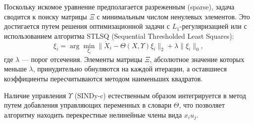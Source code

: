 Поскольку искомое уравнение предполагается разреженным (sparse), задача сводится к поиску матрицы $\Xi$ с минимальным числом ненулевых элементов. Это достигается путем решения оптимизационной задачи с $L_1$-регуляризацией или с использованием алгоритма STLSQ (Sequential Thresholded Least Squares):
\begin{equation}
\label{eq:stlsq}
\xi_i = \arg \min_{\xi_i} \| \dot{X}_i - \Theta(X, \Upsilon)\xi_i \|_2 + \lambda \| \xi_i \|_0,
\end{equation}
где $\lambda$ --- порог отсечения. Элементы матрицы $\Xi$, абсолютное значение которых меньше $\lambda$, принудительно обнуляются на каждой итерации, а оставшиеся коэффициенты пересчитываются методом наименьших квадратов.

Наличие управления $\Upsilon$ (SINDy-c) естественным образом интегрируется в метод путем добавления управляющих переменных в словари $\Theta$, что позволяет алгоритму находить перекрестные нелинейные члены вида $x_i u_j$.